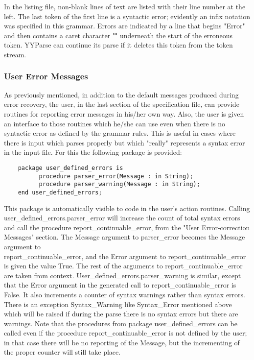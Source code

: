 In the listing file, non-blank lines of text are listed with their
line number at the left. The last token of the first line is a
syntactic error; evidently an infix notation was specified in this
grammar. Errors are indicated by a line that begins "Error" and then
contains a caret character "\^" underneath the start of the erroneous
token. YYParse can continue its parse if it deletes this token from
the token stream.


\subsubsection{User Error Messages}
As previously mentioned, in addition to the default messages produced during
error recovery, the user, in the last section of the specification file, can
provide routines for reporting error messages in his/her own way. Also, the
user is given an interface to those routines which he/she can use even when
there is no syntactic error as defined by the grammar rules. This is useful in
cases where there is input which parses properly but which "really" represents a
syntax error in the input file. For this the following package is provided:

\begin{verbatim}
    package user_defined_errors is
          procedure parser_error(Message : in String);
          procedure parser_warning(Message : in String);
    end user_defined_errors;
\end{verbatim}

This package is automatically visible to code in the user's action
routines.  Calling user\_defined\_errors.parser\_error will increase the
count of total syntax errors and call the procedure
report\_continuable\_error, from the "User Error-correction Messages"
section. The Message argument to parser\_error becomes the Message
argument to\\
report\_continuable\_error, and the Error argument to
report\_continuable\_error is given the value True. The rest of the
arguments to report\_continuable\_error are taken from context.
User\_defined\_errors.parser\_warning is similar, except that the Error
argument in the generated call to report\_continuable\_error is False.
It also increments a counter of syntax warnings rather than syntax
errors. There is an exception Syntax\_Warning like Syntax\_Error
mentioned above which will be raised if during the parse there is no
syntax errors but there are warnings.  Note that the procedures from
package user\_defined\_errors can be called even if the procedure
report\_continuable\_error is not defined by the user; in that case
there will be no reporting of the Message, but the incrementing of the
proper counter will still take place.
\newpage
